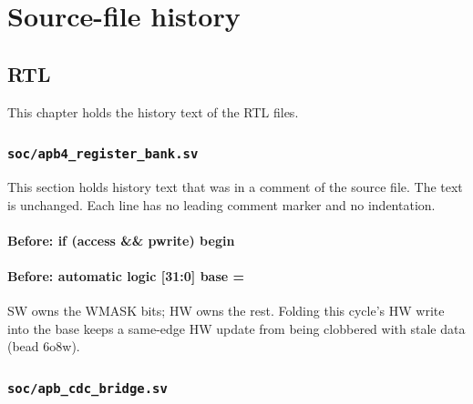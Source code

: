\part{Source-file history}\label{cr:part:source-file-history}

\chapter{RTL}\label{cr:ch:rtl}

This chapter holds the history text of the RTL files.

\section{\texttt{soc/apb4\_register\_bank.sv}}\label{cr:mod:apb4-register-bank}

This section holds history text that was in a comment of the source file. The text is unchanged. Each line has no leading comment marker and no indentation.

\begin{record}

\subsection*{Before: if (access \&\& pwrite) begin}


\subsection*{Before: automatic logic [31:0]     base =}

\begin{textblock}
SW owns the WMASK bits; HW owns the rest.  Folding this
cycle's HW write into the base keeps a same-edge HW update
from being clobbered with stale data (bead 6o8w).
\end{textblock}

\end{record}

\section{\texttt{soc/apb\_cdc\_bridge.sv}}\label{cr:mod:apb-cdc-bridge}


